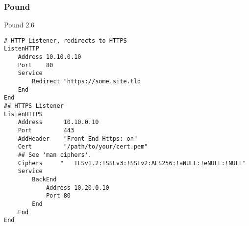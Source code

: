 \subsubsection{Pound}

Pound 2.6
	
\begin{lstlisting}[breaklines]
# HTTP Listener, redirects to HTTPS
ListenHTTP
    Address 10.10.0.10
    Port    80
    Service
        Redirect "https://some.site.tld
    End
End
## HTTPS Listener
ListenHTTPS
    Address      10.10.0.10
    Port         443
    AddHeader    "Front-End-Https: on"
    Cert         "/path/to/your/cert.pem"
    ## See 'man ciphers'.
    Ciphers     "	TLSv1.2:!SSLv3:!SSLv2:AES256:!aNULL:!eNULL:!NULL"
    Service
        BackEnd
            Address 10.20.0.10
            Port 80
        End
    End
End
\end{lstlisting}
